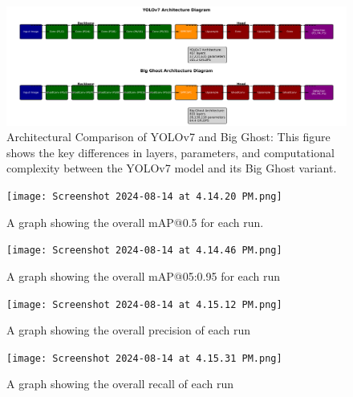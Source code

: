 \documentclass[sigplan,nonacm]{acmart}
\begin{document}
\begin{figure}
    \centering
    \includegraphics[width=1\linewidth]{combined_architecture.png}
    \caption{Architectural Comparison of YOLOv7 and Big Ghost: This figure shows the key differences in layers, parameters, and computational complexity between the YOLOv7 model and its Big Ghost variant.  }
    \label{fig:yolov7_vs_big_ghost}
\end{figure}

\begin{figure}
    \centering
    \texttt{[image: Screenshot 2024-08-14 at 4.14.20 PM.png]}
    \caption{A graph showing the overall mAP@0.5 for each run.}
    \label{fig:map05}
\end{figure}
\begin{figure}
    \centering
    \texttt{[image: Screenshot 2024-08-14 at 4.14.46 PM.png]}
    \caption{A graph showing the overall mAP@05:0.95 for each run}
    \label{fig:map05-95}
\end{figure}

\begin{figure}
    \centering
    \texttt{[image: Screenshot 2024-08-14 at 4.15.12 PM.png]}
    \caption{A graph showing the overall precision of each run}
    \label{fig:precision}
\end{figure}

\begin{figure}
    \centering
    \texttt{[image: Screenshot 2024-08-14 at 4.15.31 PM.png]}
    \caption{A graph showing the overall recall of each run}
    \label{fig:recall}
\end{figure}



\end{document}
